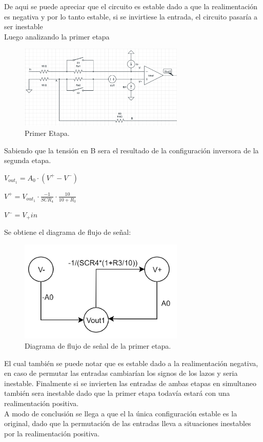De aqui se puede apreciar que el circuito es estable dado a que la realimentación es negativa y por lo tanto estable, si se invirtiese la entrada, el circuito pasaría a ser inestable\\
Luego analizando la primer etapa
\begin{figure}[H]	
	\centering
	\includegraphics[width=0.7\textwidth]{Ej3/imagenes/PrimeraEtapa.PNG}
	\caption{Primer Etapa.}
	\label{fig:PrimerEtapa}
\end{figure}
Sabiendo que la tensión en B sera el resultado de la configuración inversora de la segunda etapa.\\
\begin{center}$V_{out_1}=A_0 \cdot (V^+ - V^-)$\\\end{center}
\begin{center}$V^+= V_{out_1}\cdot \frac{-1}{SCR_4} \cdot \frac{10}{10+R_3} $\\\end{center}
\begin{center}$V^- = V_+{in}$\\\end{center}
Se obtiene el diagrama de flujo de señal:
\begin{figure}[H]	
	\centering
	\includegraphics[width=0.7\textwidth]{Ej3/imagenes/PrimerEtapaDiagrama.PNG}
	\caption{Diagrama de flujo de señal de la primer etapa.}
	\label{fig:PrimerEtapaDiagrama}
\end{figure}
El cual también se puede notar que es estable dado a la realimentación negativa, en caso de permutar las entradas cambiarían los signos de los lazos y seria inestable.
Finalmente si se invierten las entradas de ambas etapas en simultaneo también sera inestable dado que la primer etapa todavía estará con una realimentación positiva.\\
A modo de conclusión se llega a que el la única configuración estable es la original, dado que la permutación de las entradas lleva a situaciones inestables por la realimentación positiva.
